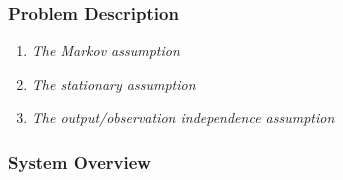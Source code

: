 \documentclass[serif,mathserif]{beamer}
\begin{document}
\begin{frame}
	\frametitle{Problem Description}
	\begin{enumerate}
		\item \textit{The Markov assumption}\pause
		\newline
		\newline
		\item \textit{The stationary assumption}\pause
		\newline
		\newline
		\item \textit{The output/observation independence assumption}
	\end{enumerate}
\end{frame}


\begin{frame}
  \frametitle{System Overview}
  \begin{figure}[t]
    \centering
    \subfigure[System Block Diagram]{
	    \texttt{[image: Figures/dog-overview]}
	}
  \end{figure}
\end{frame}
\end{document}
